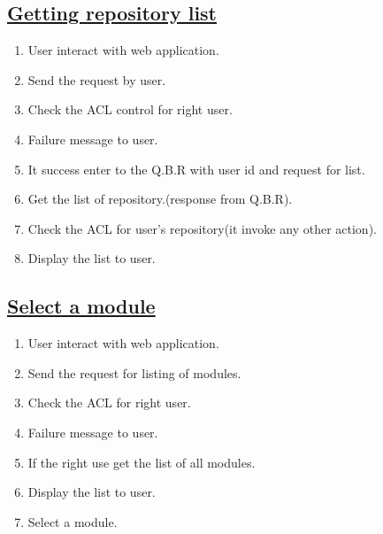 \documentclass{article}
\begin{document}
\subsection*{\underline{Getting repository list}}
\begin{enumerate}
\item User interact with web application. 
\item Send the request by user.  
\item Check the ACL control for right user. 
\item Failure message to user. 
\item It success enter to the Q.B.R with user id and request for list. 
\item Get the list of repository.(response from Q.B.R). 
\item Check the ACL for user's repository(it invoke any other action). 
\item Display the list to user.

\end{enumerate}
\subsection*{\underline{Select a module}}
\begin{enumerate}
\item User interact with web application. 
\item Send the request for listing of modules. 
\item Check the ACL for right user. 
\item Failure message to user. 
\item If the right use get the list of all modules. 
\item Display the list to user. 
\item Select a module.

\begin{center}

\label{figure:SELECT A MODULE}
\end{center}
\end{enumerate}
\end{document}
